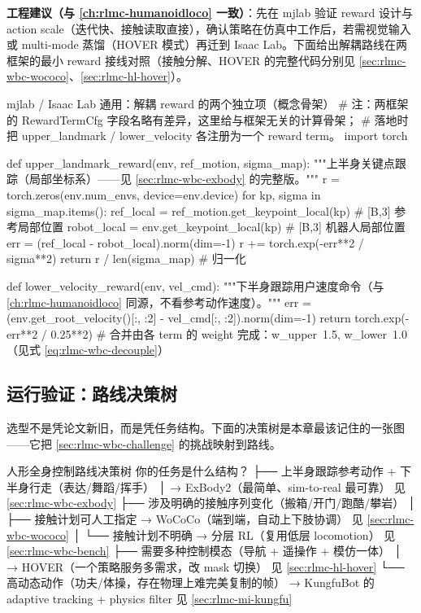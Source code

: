 \textbf{工程建议（与 \cref{ch:rlmc-humanoidloco} 一致）}：先在 mjlab 验证 reward 设计与 action scale（迭代快、接触读取直接），确认策略在仿真中工作后，若需视觉输入或 multi-mode 蒸馏（HOVER 模式）再迁到 Isaac Lab。下面给出解耦路线在两框架的最小 reward 接线对照（接触分解、HOVER 的完整代码分别见 \cref{sec:rlmc-wbc-wococo}、\cref{sec:rlmc-hl-hover}）。

\begin{codebox}[Python]{mjlab / Isaac Lab 通用：解耦 reward 的两个独立项（概念骨架）}
# 注：两框架的 RewardTermCfg 字段名略有差异，这里给与框架无关的计算骨架；
# 落地时把 upper_landmark / lower_velocity 各注册为一个 reward term。
import torch

def upper_landmark_reward(env, ref_motion, sigma_map):
    """上半身关键点跟踪（局部坐标系）——见 \cref{sec:rlmc-wbc-exbody} 的完整版。"""
    r = torch.zeros(env.num_envs, device=env.device)
    for kp, sigma in sigma_map.items():
        ref_local   = ref_motion.get_keypoint_local(kp)   # [B,3] 参考局部位置
        robot_local = env.get_keypoint_local(kp)          # [B,3] 机器人局部位置
        err = (ref_local - robot_local).norm(dim=-1)
        r += torch.exp(-err**2 / sigma**2)
    return r / len(sigma_map)                              # 归一化

def lower_velocity_reward(env, vel_cmd):
    """下半身跟踪用户速度命令（与 \cref{ch:rlmc-humanoidloco} 同源，不看参考动作速度）。"""
    err = (env.get_root_velocity()[:, :2] - vel_cmd[:, :2]).norm(dim=-1)
    return torch.exp(-err**2 / 0.25**2)
# 合并由各 term 的 weight 完成：w_upper~1.5, w_lower~1.0（见式 \eqref{eq:rlmc-wbc-decouple}）
\end{codebox}

\subsection{运行验证：路线决策树}
选型不是凭论文新旧，而是凭任务结构。下面的决策树是本章最该记住的一张图——它把 \cref{sec:rlmc-wbc-challenge} 的挑战映射到路线。

\begin{codebox}[text]{人形全身控制路线决策树}
你的任务是什么结构？
├── 上半身跟踪参考动作 + 下半身行走（表达/舞蹈/挥手）
│     → ExBody2（最简单、sim-to-real 最可靠）           见 \cref{sec:rlmc-wbc-exbody}
├── 涉及明确的接触序列变化（搬箱/开门/跑酷/攀岩）
│     ├── 接触计划可人工指定 → WoCoCo（端到端，自动上下肢协调） 见 \cref{sec:rlmc-wbc-wococo}
│     └── 接触计划不明确     → 分层 RL（复用低层 locomotion）      见 \cref{sec:rlmc-wbc-bench}
├── 需要多种控制模态（导航 + 遥操作 + 模仿一体）
│     → HOVER（一个策略服务多需求，改 mask 切换）         见 \cref{sec:rlmc-hl-hover}
└── 高动态动作（功夫/体操，存在物理上难完美复制的帧）
      → KungfuBot 的 adaptive tracking + physics filter   见 \cref{sec:rlmc-mi-kungfu}
\end{codebox}


